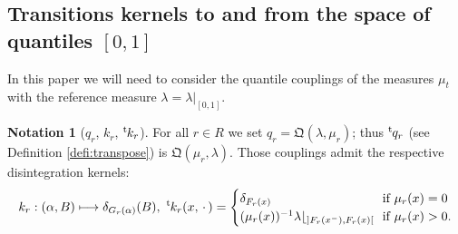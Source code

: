 \documentclass[JEP,XML,SOM,Unicode,NoEqCountersInSection,NoFloatCountersInSection,published]{cedram}
\newcommand\mto{\mathchoice{\longmapsto}{\mapsto}{\mapsto}{\mapsto}}
\theoremstyle{plain}
\theoremstyle{definition}
\newtheorem{notation}[them]{Notation} %
\newcommand{\como}{\mathfrak{Q}}
\let\mb\relax
\let\mn\relax
\newcommand{\trans}{{}^{\mathrm{t}}\mkern-1mu}
\newcommand{\espcdot}{\mbox{$\,\cdot\,$}}
\newcommand{\Lg}{\lambda|_{[0,1]}}
\newcommand{\la}{\lambda}
\begin{document}
\subsection{Transitions kernels to and from the space of quantiles \mb$[0,1]$\mn}\label{subsec:little_t}
In this paper we will need to consider the quantile couplings of the measures $\mu_t$ with the reference measure $\la=\Lg$.

\begin{notation}[$q_r$, $k_r$, $\trans k_r$] \label{notation:kernels} For all $r\in R$ we set $q_r= \como(\la,\mu_r)$; thus $\trans q_r$ (see Definition \ref{defi:transpose}) is $\como(\mu_r, \lambda)$. Those couplings admit the respective disintegration kernels:\vspace*{-3pt}
\begin{align*}
k_r:(\alpha,B)\mto \delta_{G_{r}(\alpha)}(B),\ \trans{k}_r(x,\espcdot)=
\begin{cases}
\delta_{F_r(x)}&\!\!\text{if }\mu_r(x)=0\\
(\mu_r(x))^{-1}\la\lfloor_{]F_r(x^-),F_r(x)[}&\!\!\text{if }\mu_r(x)>0.\\
\end{cases}
\end{align*}
\end{notation}
\end{document}
